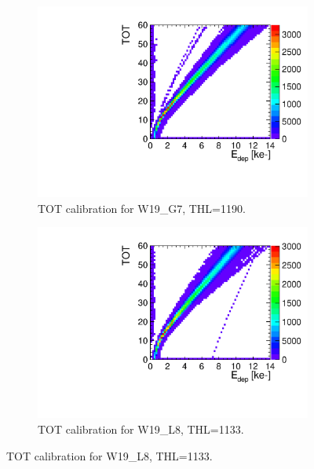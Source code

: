 \begin{figure}[htbp] \centering
  \begin{subfigure}[b]{0.45\textwidth}
    \includegraphics[width=\textwidth]{./figures/Calibration/TOTcalibration_W0019_G07_thresh1190.pdf}
    \caption{TOT calibration for W19\_G7, THL=1190.}
    \label{fig:TOTcalibW19G7}
  \end{subfigure}\hfill
  \begin{subfigure}[b]{0.45\textwidth}
    \includegraphics[width=\textwidth]{./figures/Calibration/TOTcalibration_W0019_L08_thresh1133.pdf}
    \caption{TOT calibration for W19\_L8, THL=1133.}
    \label{fig:TOTcalibW19L8}
  \end{subfigure}
\end{figure}



